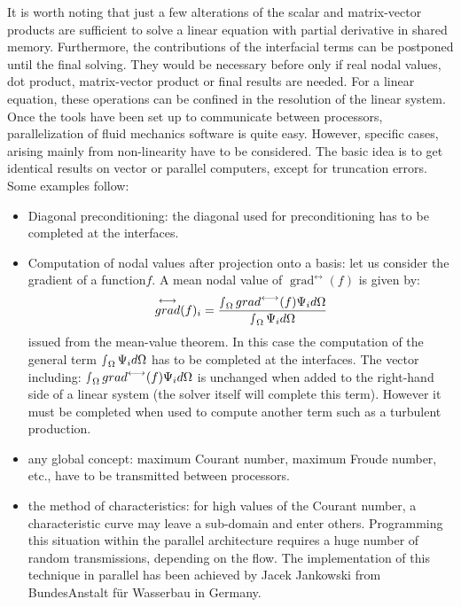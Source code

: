 It is worth noting that just a few alterations of the scalar and matrix-vector
products are sufficient to solve a linear equation with partial derivative in
shared memory. Furthermore, the contributions of the interfacial terms can be
postponed until the final solving. They would be necessary before only if real
nodal values, dot product, matrix-vector product or final results are needed.
For a linear equation, these operations can be confined in the resolution of
the linear system. Once the tools have been set up to communicate between
processors, parallelization of fluid mechanics software is quite easy. However,
specific cases, arising mainly from non-linearity have to be considered. The
basic idea is to get identical results on vector or parallel computers, except
for truncation errors. Some examples follow:
\begin{itemize}
  \item Diagonal preconditioning: the diagonal used for preconditioning has to
    be completed at the interfaces.
  \item Computation of nodal values after projection onto a basis: let us
    consider the gradient of a function$f$. A mean nodal value of
    $\mathop{grad}^{\longleftrightarrow} (f)$  is given by:
    \[\mathop{grad}^{\longleftrightarrow} (f)_{i} =
      \frac{\mathop{\smallint}\nolimits_{\Omega } \mathop{grad}^{\longleftrightarrow} (f)\Psi _{i}
d\Omega }{\mathop{\smallint }\nolimits_{\Omega } \Psi _{i}  d\Omega } \]
issued from the mean-value theorem. In this case the computation of the general
term  $\mathop{\smallint }\nolimits_{\Omega } \Psi _{i}  d\Omega $  has to be
completed at the interfaces. The vector including: $\mathop{\smallint
}\nolimits_{\Omega } \mathop{grad}^{\longleftrightarrow} (f)\Psi _{i}
d\Omega $ is unchanged when added to the right-hand side of a linear system
(the solver itself will complete this term). However it must be completed when
used to compute another term such as a turbulent production.
  \item any global concept: maximum Courant number, maximum Froude number,
    etc., have to be transmitted between processors.

  \item the method of characteristics: for high values of the Courant number, a
    characteristic curve may leave a sub-domain and enter others. Programming
    this situation within the parallel architecture requires a huge number of
    random transmissions, depending on the flow. The implementation of this
    technique in parallel has been achieved by Jacek Jankowski from
    BundesAnstalt f\"{u}r Wasserbau in Germany.
\end{itemize}

